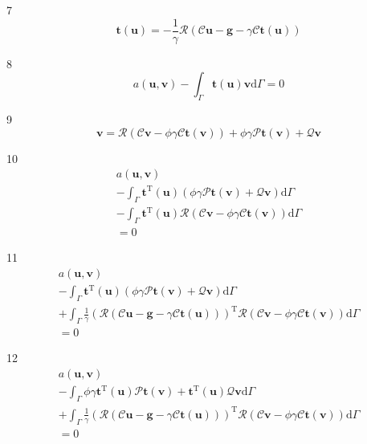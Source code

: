 \documentclass[a4paper,12pt]{article}
\begin{document}
7
\begin{equation}
\mathbf{t}(\mathbf{u}) =
-\frac{1}{\gamma}
\mathcal{R}(\mathcal{C}\mathbf{u}-\mathbf{g}-\gamma\mathcal{C}\mathbf{t}(\mathbf{u}))
\end{equation}

8
\begin{equation}
a(\mathbf{u},\mathbf{v}) - \int_\Gamma \mathbf{t}(\mathbf{u})\mathbf{v} \textrm{d}\Gamma = 0
\end{equation}

9
\begin{equation}
\mathbf{v} =
\mathcal{R}(\mathcal{C}\mathbf{v}-\phi\gamma\mathcal{C}\mathbf{t}(\mathbf{v}))
+\phi\gamma\mathcal{P}\mathbf{t}(\mathbf{v}) + \mathcal{Q}\mathbf{v}
\end{equation}

10
\begin{equation}
\begin{split}
a(\mathbf{u},\mathbf{v})
\\-
\int_\Gamma
\mathbf{t}^{\textrm{T}}(\mathbf{u})
(
\phi\gamma\mathcal{P}\mathbf{t}(\mathbf{v})
+
\mathcal{Q}\mathbf{v}
)
\textrm{d}\Gamma
\\-
\int_\Gamma
\mathbf{t}^\textrm{T}(\mathbf{u})
\mathcal{R}(\mathcal{C}\mathbf{v}-\phi\gamma\mathcal{C}\mathbf{t}(\mathbf{v}))
\textrm{d}\Gamma
\\=
0
\end{split}
\end{equation}

11
\begin{equation}
\begin{split}
a(\mathbf{u},\mathbf{v})
\\-
\int_\Gamma
\mathbf{t}^{\textrm{T}}(\mathbf{u})
(\phi\gamma\mathcal{P}\mathbf{t}(\mathbf{v})+\mathcal{Q}\mathbf{v})
\textrm{d}\Gamma
\\+
\int_\Gamma
\frac{1}{\gamma}
(
\mathcal{R}(\mathcal{C}\mathbf{u}-\mathbf{g}-\gamma\mathcal{C}\mathbf{t}(\mathbf{u}))
)^\textrm{T}
\mathcal{R}(\mathcal{C}\mathbf{v}-\phi\gamma\mathcal{C}\mathbf{t}(\mathbf{v}))
\textrm{d}\Gamma
\\=
0
\end{split}
\end{equation}

12
\begin{equation}
\begin{split}
a(\mathbf{u},\mathbf{v})
\\-
\int_\Gamma
\phi\gamma\mathbf{t}^{\textrm{T}}(\mathbf{u})\mathcal{P}\mathbf{t}(\mathbf{v})
+
\mathbf{t}^\textrm{T}(\mathbf{u})\mathcal{Q}\mathbf{v}
\textrm{d}\Gamma
\\+
\int_\Gamma
\frac{1}{\gamma}
(
\mathcal{R}(\mathcal{C}\mathbf{u}-\mathbf{g}-\gamma\mathcal{C}\mathbf{t}(\mathbf{u}))
)^\textrm{T}
\mathcal{R}(\mathcal{C}\mathbf{v}-\phi\gamma\mathcal{C}\mathbf{t}(\mathbf{v}))
\textrm{d}\Gamma
\\=
0
\end{split}
\end{equation}
\end{document}
